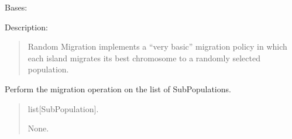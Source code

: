 \documentclass[letterpaper,10pt,english]{sphinxmanual}
\begin{document}
\begin{fulllineitems}
\label{\detokenize{pygenalgo.operators.migration:pygenalgo.operators.migration.random_migration.RandomMigration}}
\pysigstartsignatures
{}
\pysigstopsignatures
\sphinxAtStartPar
Bases: {\hyperref[\detokenize{pygenalgo.operators.migration:pygenalgo.operators.migration.migration_operator.MigrationOperator}]{}}

\sphinxAtStartPar
Description:
\begin{quote}

\sphinxAtStartPar
Random Migration implements a “very basic” migration policy in which
each island migrates its best chromosome to a randomly selected population.
\end{quote}

\begin{fulllineitems}
\label{\detokenize{pygenalgo.operators.migration:pygenalgo.operators.migration.random_migration.RandomMigration.migrate}}
\pysigstartsignatures
{}
\pysigstopsignatures
\sphinxAtStartPar
Perform the migration operation on the list of SubPopulations.
\begin{quote}\begin{description}
\sphinxAtStartPar
{} \textendash{} list{[}SubPopulation{]}.

\sphinxAtStartPar
None.

\end{description}\end{quote}

\end{fulllineitems}


\end{fulllineitems}
\end{document}
